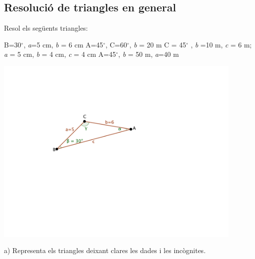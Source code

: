 \subsection{Resolució de triangles en general}
\begin{mylist}
	
	
   	\vspace{-3cm}
\exer \begin{minipage}[t]{0.4\textwidth}
	Resol els següents triangles:  \vspace{0.2cm}
	\begin{tasks}
		\task B=30${}^\circ$, \emph{a}=5 cm, \emph{b} = 6 cm \vspace{0.2cm}
		\task A=45${}^\circ$, C=60${}^\circ$, \emph{b} = 20 m \vspace{0.2cm}
		\task C = 45${}^\circ$ , \emph{b} =10 m, \emph{c} = 6 m;  \vspace{0.2cm}
		\task \emph{a} = 5 cm, \emph{b} = 4 cm, \emph{c} = 4 cm \vspace{0.2cm}
		\task A=45${}^\circ$, \emph{b} = 50 m, \emph{a}=40 m
	\end{tasks}
\end{minipage}
\begin{minipage}{0.45\textwidth}
	
	\vspace{3cm}
	
	\includegraphics[width=0.9\textwidth]{img-03/trig-sample-triangle}
	
	{\footnotesize a) Representa els triangles deixant clares les dades i les incògnites.}
\end{minipage}
	\answers[cols=1]{[
 $A=24.52$; $C=125.38$; $c=9.78$,
$B=75$; $a=14.64$; $c=17.93$,
 No existeix cap triangle,
$A=77.36$; $B=C=51.32$,
Solució 1: $B=62.1$; $C=72.9$; $c=54.1$. Solució 2: $B=17.1$; $C=117.9$; $c=50$.]}
	

\end{mylist}
